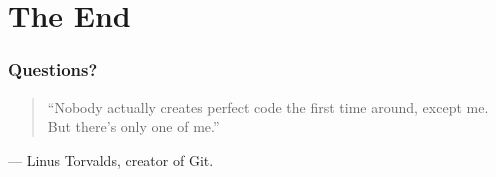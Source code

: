\documentclass{beamer}
\begin{document}
\section*{The End}
\begin{frame}
 \transdissolve
 \frametitle{Questions?}
 \begin{quote}
  \begin{center}
   ``Nobody actually creates perfect code the first time around, except me. But there's only one of me.''
  \end{center}
 \end{quote}
 \begin{flushright}
   --- Linus Torvalds, creator of Git.
 \end{flushright}
\end{frame}
\end{document}
